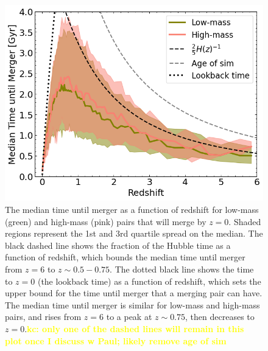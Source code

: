 \documentclass[twocolumn,linenumbers]{aastex631}
\newcommand{\kc}[1]{\textcolor{yellow}{\textbf{kc: #1}} }
\begin{document}
    \begin{figure}[htb]
        \centering
        \includegraphics[width=\columnwidth]{plots/bet-on-it/8_timescale_mod.png}
        \caption{The median time until merger as a function of redshift for low-mass (green) and high-mass (pink) pairs that will merge by $z=0$. Shaded regions represent the 1st and 3rd quartile spread on the median. %
        The black dashed line shows the fraction of the Hubble time as a function of redshift, which bounds the median time until merger from $z=6$ to $z\sim0.5-0.75$.
        The dotted black line shows the time to $z=0$ (the lookback time) as a function of redshift, which sets the upper bound for the time until merger that a merging pair can have. 
        The median time until merger is similar for low-mass and high-mass pairs, and rises from $z=6$ to a peak at $z\sim0.75$, then decreases to $z=0$.\kc{only one of the dashed lines will remain in this plot once I discuss w Paul; likely remove age of sim}}
        \label{fig:timescales}
    \end{figure}
    
\end{document}

